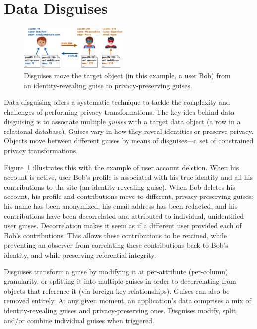 \section{Data Disguises}
\begin{figure}[t!]
    \centering
    \includegraphics[width=0.47\textwidth]{img/disguises_new}

    \caption{Disguises move the target object (in this example, a user Bob) from an identity-revealing
    guise to privacy-preserving guises.}
    \label{fig:example}
\end{figure}

Data disguising offers a systematic technique to tackle the complexity and challenges of performing
privacy transformations.
%
The key idea behind data disguising is to associate multiple \emph{guises} with a target data
object (\ie a row in a relational database). Guises vary in how they reveal identities or preserve privacy.
%
Objects move between different guises by means of disguises---a set of constrained privacy
transformations.

Figure~\ref{fig:example} illustrates this with the example of user account deletion.
%
When his account is active, user Bob's profile is associated with his true identity and all his
contributions to the site (an identity-revealing guise).
%
When Bob deletes his account, his profile and contributions move to different, privacy-preserving
guises: his name has been anonymized, his email address has been redacted, and his contributions
have been decorrelated and attributed to individual, unidentified user guises.
%
Decorrelation makes it seem as if a different user provided each of Bob's contributions. This allows
these contributions to be retained, while preventing an observer from correlating these
contributions back to Bob's identity, and while preserving referential integrity.

Disguises transform a guise by modifying it at per-attribute (\ie per-column) granularity, or
splitting it into multiple guises in order to decorrelating from objects that reference it (via \eg foreign-key relationships).
Guises can also be removed entirely.
At any given moment, an application's data comprises a mix of identity-revealing guises
and privacy-preserving ones. Disguises modify, split, and/or combine individual guises when triggered.

